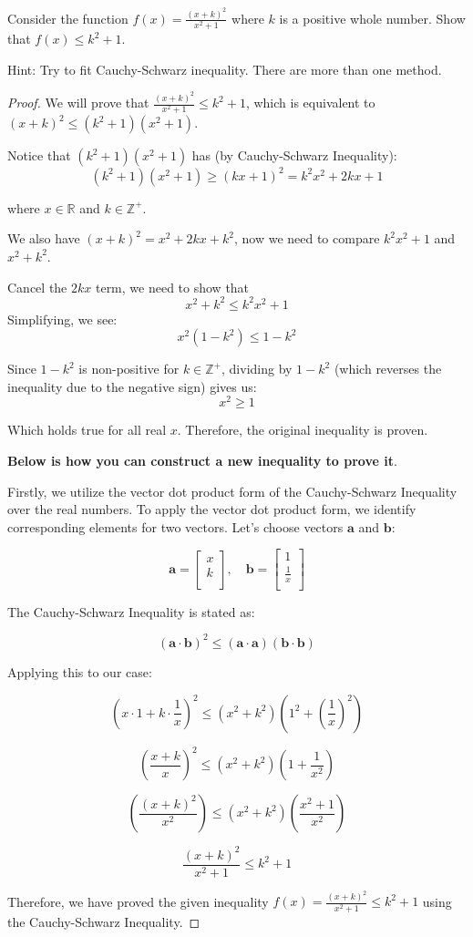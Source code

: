 \begin{exercise}
    Consider the function \( f(x) = \frac{(x+k)^2}{x^2+1} \) where \( k \) is a positive whole number. Show that \( f(x) \leq k^2 + 1 \).
\end{exercise}
Hint: Try to fit Cauchy-Schwarz inequality. There are more than one method.
\begin{proof}
    We will prove that \( \frac{(x+k)^2}{x^2+1} \leq k^2 + 1 \), which is equivalent to \( (x+k)^2 \leq (k^2 + 1)(x^2 + 1) \).

Notice that \( (k^2 + 1)(x^2 + 1) \) has (by Cauchy-Schwarz Inequality):
\[ (k^2 + 1)(x^2 + 1) \geq (kx + 1)^2 = k^2x^2 + 2kx + 1 \]

where \( x \in \mathbb{R} \) and \( k \in \mathbb{Z}^+ \).

We also have \( (x+k)^2 = x^2 + 2kx + k^2 \), now we need to compare \( k^2x^2 + 1 \) and \( x^2 + k^2 \).

Cancel the $2kx$ term, we need to show that
\[ x^2 + k^2 \leq k^2x^2 + 1 \]
Simplifying, we see:
\[ x^2(1 - k^2) \leq 1 - k^2 \]

Since \( 1 - k^2 \) is non-positive for \( k \in \mathbb{Z}^+ \), dividing by \( 1 - k^2 \) (which reverses the inequality due to the negative sign) gives us:
\[ x^2 \geq 1 \]

Which holds true for all real \( x \). Therefore, the original inequality is proven.

\textbf{Below is how you can construct a new inequality to prove it}.

Firstly, we utilize the vector dot product form of the Cauchy-Schwarz Inequality over the real numbers. To apply the vector dot product form, we identify corresponding elements for two vectors. Let's choose vectors \( \mathbf{a} \) and \( \mathbf{b} \):

\[
\mathbf{a} = \begin{bmatrix}
x \\
k \\
\end{bmatrix}, \quad \mathbf{b} = \begin{bmatrix}
1 \\
\frac{1}{x} \\
\end{bmatrix}
\]

The Cauchy-Schwarz Inequality is stated as:

\[
(\mathbf{a} \cdot \mathbf{b})^2 \leq (\mathbf{a} \cdot \mathbf{a})(\mathbf{b} \cdot \mathbf{b})
\]

Applying this to our case:

\[
\left( x \cdot 1 + k \cdot \frac{1}{x} \right)^2 \leq (x^2 + k^2)\left( 1^2 + \left(\frac{1}{x}\right)^2 \right)
\]

\[
\left( \frac{x + k}{x} \right)^2 \leq (x^2 + k^2)\left( 1 + \frac{1}{x^2} \right)
\]

\[
\left(\frac{(x+k)^2}{x^2}\right) \leq (x^2 + k^2)\left( \frac{x^2+1}{x^2} \right)
\]

\[
\frac{(x+k)^2}{x^2+1} \leq k^2 + 1
\]

Therefore, we have proved the given inequality \( f(x) = \frac{(x+k)^2}{x^2+1} \leq k^2 + 1 \) using the Cauchy-Schwarz Inequality.

\end{proof}
